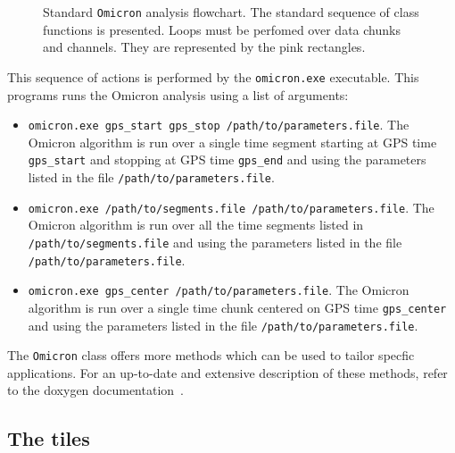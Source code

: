 \begin{figure}
  \center
  \caption{Standard \texttt{Omicron} analysis flowchart. The standard sequence of class functions is presented. Loops must be perfomed over data chunks and channels. They are represented by the pink rectangles.}
  \label{fig:omicron_flowchart}
\end{figure}

This sequence of actions is performed by the \texttt{omicron.exe} executable. This programs runs the Omicron analysis using a list of arguments:
\begin{itemize}
  \item \texttt{omicron.exe gps\_start gps\_stop /path/to/parameters.file}. The Omicron algorithm is run over a single time segment starting at GPS time \texttt{gps\_start} and stopping at GPS time \texttt{gps\_end} and using the parameters listed in the file \texttt{/path/to/parameters.file}.
  \item \texttt{omicron.exe /path/to/segments.file /path/to/parameters.file}. The Omicron algorithm is run over all the time segments listed in \texttt{/path/to/segments.file} and using the parameters listed in the file \texttt{/path/to/parameters.file}.
  \item \texttt{omicron.exe gps\_center /path/to/parameters.file}. The Omicron algorithm is run over a single time chunk centered on GPS time \texttt{gps\_center} and using the parameters listed in the file \texttt{/path/to/parameters.file}.
\end{itemize}
The \texttt{Omicron} class offers more methods which can be used to tailor specfic applications. For an up-to-date and extensive description of these methods, refer to the doxygen documentation~\cite{Omicron_doxygen}.


\subsection{The tiles} \label{sec:algorithm:tiling}

